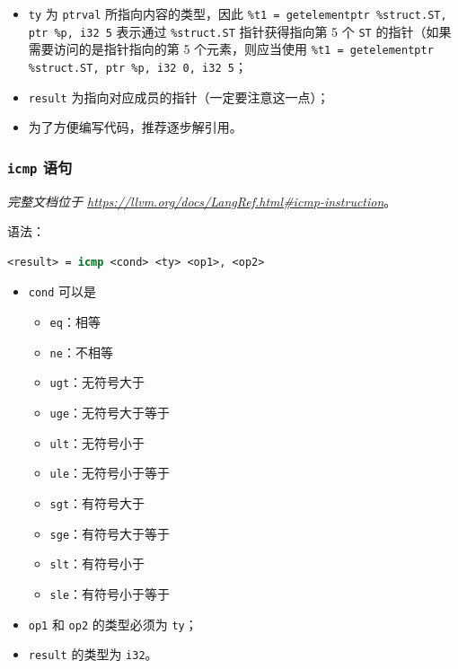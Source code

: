 \begin{itemize}
  \item \texttt{ty} 为 \texttt{ptrval} 所指向内容的类型，因此
    \texttt{\%t1 = getelementptr \%struct.ST, ptr \%p, i32 5}
    表示通过 \texttt{\%struct.ST} 指针获得指向第 5 个 \texttt{ST}
    的指针（如果需要访问的是指针指向的第 5 个元素，则应当使用
    \texttt{\%t1 = getelementptr \%struct.ST, ptr \%p, i32 0, i32 5}；
  \item \texttt{result} 为指向对应成员的指针（一定要注意这一点）；
  \item 为了方便编写代码，推荐逐步解引用。
\end{itemize}

\subsubsection{\texttt{icmp} 语句}\label{LLVM-icmp-statements}

\textit{完整文档位于 \url{https://llvm.org/docs/LangRef.html\#icmp-instruction}}。

语法：
\begin{lstlisting}[language=llvm]
<result> = icmp <cond> <ty> <op1>, <op2>
\end{lstlisting}

\begin{itemize}
  \item \texttt{cond} 可以是
    \begin{itemize}
      \item \texttt{eq}：相等
      \item \texttt{ne}：不相等
      \item \texttt{ugt}：无符号大于
      \item \texttt{uge}：无符号大于等于
      \item \texttt{ult}：无符号小于
      \item \texttt{ule}：无符号小于等于
      \item \texttt{sgt}：有符号大于
      \item \texttt{sge}：有符号大于等于
      \item \texttt{slt}：有符号小于
      \item \texttt{sle}：有符号小于等于
    \end{itemize}
  \item \texttt{op1} 和 \texttt{op2} 的类型必须为 \texttt{ty}；
  \item \texttt{result} 的类型为 \texttt{i32}。
\end{itemize}

